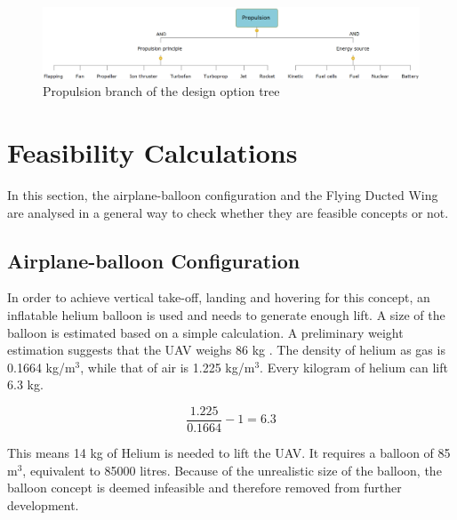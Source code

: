 \begin{figure}[H]
\centering
\includegraphics[width=1\textwidth]{Concepts/Figures/Propulsion}
\caption{Propulsion branch of the design option tree}
\label{fig:DOTprop}
\end{figure}

\section{Feasibility Calculations}
\label{sec:feas_calc}
In this section, the airplane-balloon configuration and the Flying Ducted Wing are analysed in a general way to check whether they are feasible concepts or not.

\subsection{Airplane-balloon Configuration}
In order to achieve vertical take-off, landing and hovering for this concept, an inflatable helium balloon is used and needs to generate enough lift. A size of the balloon is estimated based on a simple calculation. A preliminary weight estimation suggests that the UAV weighs 86 kg \cite{baseline}. The density of helium as gas is 0.1664 kg/m$^3$\footnotemark, while that of air is 1.225 kg/m$^3$. Every kilogram of helium can lift 6.3 kg.

$$ \frac{1.225}{0.1664} - 1 = 6.3$$



This means 14 kg of Helium is needed to lift the UAV. It requires a balloon of 85 m$^3$, equivalent to 85000 litres. Because of the unrealistic size of the balloon, the balloon concept is deemed infeasible and therefore removed from further development.

